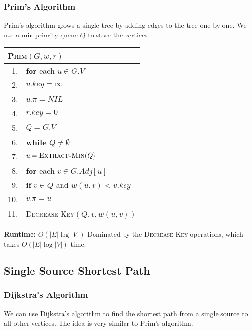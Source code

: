 \documentclass[a4paper,12pt]{article}
\begin{document}
\subsubsection{Prim's Algorithm}

Prim's algorithm grows a single tree by adding edges to the tree one by one.
We use a min-priority queue $Q$ to store the vertices.

\begin{center}
	\begin{tabular}{rl}
		\toprule
		\multicolumn{2}{l}{\textsc{Prim}$(G, w, r)$} \\
		\midrule
		1. & \textbf{for} each $u \in G.V$ \\
		2. & \quad $u.key = \infty$ \\
		3. & \quad $u.\pi = NIL$ \\
		4. & $r.key = 0$ \\
		5. & $Q = G.V$ \\
		6. & \textbf{while} $Q \neq \emptyset$ \\
		7. & \quad $u = \textsc{Extract-Min}(Q)$ \\
		8. & \quad \textbf{for} each $v \in G.Adj[u]$ \\
		9. & \quad \quad \textbf{if} $v \in Q$ and $w(u, v) < v.key$ \\
		10. & \quad \quad \quad $v.\pi = u$ \\
		11. & \quad \quad \quad \textsc{Decrease-Key}$(Q, v, w(u, v))$ \\
		\bottomrule
	\end{tabular}
\end{center}

\textbf{Runtime:}
$O(|E| \log |V|)$
Dominated by the \textsc{Decrease-Key} operations, which takes $O(|E| \log |V|)$ time.


\subsection{Single Source Shortest Path}

\subsubsection{Dijkstra's Algorithm}

We can use Dijkstra's algorithm to find the shortest path from a single source to all other vertices.
The idea is very similar to Prim's algorithm.
\end{document}
